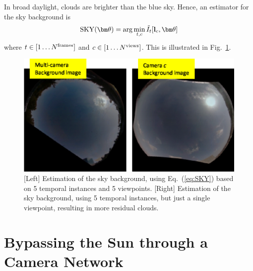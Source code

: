 \documentclass[runningheads]{llncs}
\begin{document}
In broad daylight, clouds are brighter than the blue sky. Hence, an estimator for the sky background is
\begin{equation}
 {\rm SKY}({\bm \theta})= \arg\min_{t,c} \tilde I_t[{\bf l}_c,{\bm \theta}]
 \label{eq:SKY}
\end{equation}
where $t\in[1\ldots N^{\rm frames}]$ and $c\in[1\ldots N^{\rm views}]$.
This is illustrated in Fig.~\ref{fig:sky}.
\begin{figure}[t!]
\begin{center}
   \includegraphics[width=0.5\linewidth]{figures/Background.eps}
\end{center}
   \vspace{-0.6cm}
   \caption{[Left] Estimation of the sky background, using Eq.~(\ref{eq:SKY}) based on 5 temporal
   instances and 5 viewpoints. [Right] Estimation of the sky background, using 5 temporal
   instances, but just a single viewpoint, resulting in more residual clouds.}
\label{fig:sky}
\end{figure}


\section{Bypassing the Sun through a Camera Network}
\label{sec:mutiSun}
\end{document}
